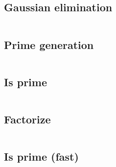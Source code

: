 \subsection{Gaussian elimination}
\inputminted[frame=single,framesep=3pt,breaklines=true,tabsize=2,linenos,label=O($N^3$)]{c++}{math/gaussian-elimination.cpp}

\subsection{Prime generation}
\inputminted[frame=single,framesep=3pt,tabsize=2,breaklines=true,linenos,label=O(N log(log(N)))]{c++}{math/prime-gen.cpp}

\subsection{Is prime}
\inputminted[frame=single,framesep=3pt,tabsize=2,breaklines=true,linenos,label=O(sqrt(N))]{c++}{math/is-prime.cpp}

\subsection{Factorize}
\inputminted[frame=single,framesep=3pt,tabsize=2,breaklines=true,linenos,label=O(N log(log(N)))]{c++}{math/factorize.cpp}

\subsection{Is prime (fast)}
\inputminted[frame=single,framesep=3pt,tabsize=2,breaklines=true,linenos,label=O(polylog(N))]{c++}{math/is-prime-fast.cpp}
